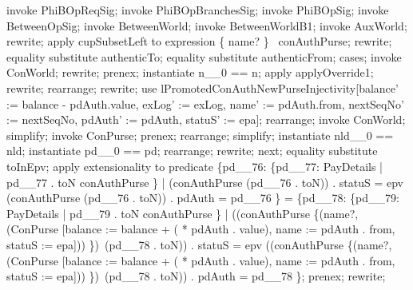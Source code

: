 \begin{LPScript}\begin{zproof}[lPromotedAuxWorldReqType]
\end{zproof}%
    invoke PhiBOpReqSig;
    invoke PhiBOpBranchesSig;
    invoke PhiBOpSig;
    invoke BetweenOpSig;
    invoke BetweenWorld;
    invoke BetweenWorldB1;
    invoke AuxWorld;
    rewrite;
    apply cupSubsetLeft to expression \{ name? \} \cup \dom~conAuthPurse;
    rewrite;
    equality substitute authenticTo;
    equality substitute authenticFrom;
    cases;
        invoke ConWorld;
        rewrite;
        prenex;
        instantiate n\_\_0 == n;
        apply applyOverride1;
        rewrite;
        rearrange;
        rewrite;
        use lPromotedConAuthNewPurseInjectivity[balance' := balance - pdAuth.value,
            exLog' := exLog, name' := pdAuth.from, nextSeqNo' := nextSeqNo,
            pdAuth' := pdAuth, statuS' := epa];
        rearrange;
        invoke ConWorld;
        simplify;
        invoke ConPurse;
        prenex;
        rearrange;
        simplify;
        instantiate nld\_\_0 == nld;
        instantiate pd\_\_0 == pd;
        rearrange;
        rewrite;
    next;
        equality substitute toInEpv;
		apply extensionality to predicate 
			\{pd\_\_76: \{pd\_\_77: PayDetails | pd\_\_77 . toN \in \dom conAuthPurse \} | 
				(conAuthPurse (pd\_\_76 . toN)) . statuS = epv \land 
				(conAuthPurse (pd\_\_76 . toN)) . pdAuth = pd\_\_76 \} 
			= 
		    \{pd\_\_78: \{pd\_\_79: PayDetails | pd\_\_79 . toN \in \dom conAuthPurse \} | 
		    	((conAuthPurse \oplus \{(name?, \theta (ConPurse [balance := balance + 
		    		( * pdAuth . value), name := pdAuth . from, statuS := epa])) \})~(pd\_\_78 . toN)) . statuS = epv 
		    	\land ((conAuthPurse \oplus \{(name?, \theta (ConPurse [balance := balance + ( * pdAuth . value), 
		    		name := pdAuth . from, statuS := epa])) \})~(pd\_\_78 . toN)) . pdAuth = pd\_\_78 \};
        prenex;
        rewrite;

\end{LPScript}

